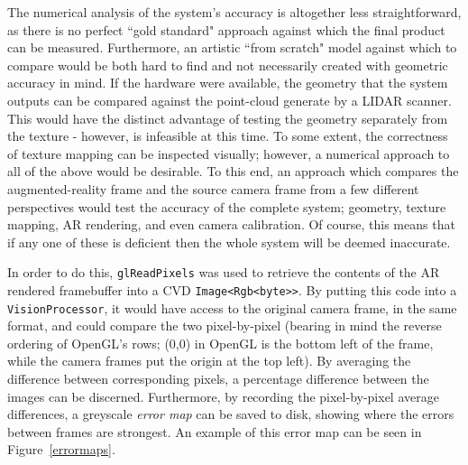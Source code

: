 \documentclass[a4paper,10pt]{article}
\begin{document}
The numerical analysis of the system's accuracy is altogether less straightforward, as there is no perfect ``gold standard" approach against which the final product can be measured. Furthermore, an artistic ``from scratch" model against which to compare would be both hard to find and not necessarily created with geometric accuracy in mind. If the hardware were available, the geometry that the system outputs can be compared against the point-cloud generate by a LIDAR scanner. This would have the distinct advantage of testing the geometry separately from the texture - however, is infeasible at this time. To some extent, the correctness of texture mapping can be inspected visually; however, a numerical approach to all of the above would be desirable. To this end, an approach which compares the augmented-reality frame and the source camera frame from a few different perspectives would test the accuracy of the complete system; geometry, texture mapping, AR rendering, and even camera calibration. Of course, this means that if any one of these is deficient then the whole system will be deemed inaccurate. 

In order to do this, \texttt{glReadPixels} was used to retrieve the contents of the AR rendered framebuffer into a CVD \texttt{Image\textless Rgb\textless byte\textgreater \textgreater}. By putting this code into a \texttt{VisionProcessor}, it would have access to the original camera frame, in the same format, and could compare the two pixel-by-pixel (bearing in mind the reverse ordering of OpenGL's rows; (0,0) in OpenGL is the bottom left of the frame, while the camera frames put the origin at the top left). By averaging the difference between corresponding pixels, a percentage difference between the images can be discerned. Furthermore, by recording the pixel-by-pixel average differences, a greyscale \textit{error map} can be saved to disk, showing where the errors between frames are strongest. An example of this error map can be seen in Figure~\ref{errormaps}.
\end{document}
